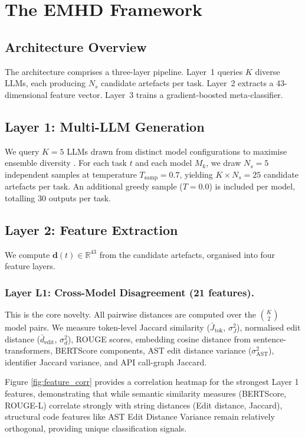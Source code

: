 \documentclass{svproc}
\begin{document}
\section{The EMHD Framework}\label{sec:method}

\subsection{Architecture Overview}

The architecture comprises a three-layer pipeline. Layer~1 queries $K$ diverse LLMs, each producing $N_s$ candidate artefacts per task. Layer~2 extracts a 43-dimensional feature vector. Layer~3 trains a gradient-boosted meta-classifier.

\subsection{Layer 1: Multi-LLM Generation}
We query $K=5$ LLMs drawn from distinct model configurations to maximise ensemble diversity \cite{brown2005diversity}. For each task $t$ and each model $M_k$, we draw $N_s = 5$ independent samples at temperature $T_{\mathrm{samp}} = 0.7$, yielding $K \times N_s = 25$ candidate artefacts per task. An additional greedy sample ($T=0.0$) is included per model, totalling 30 outputs per task.

\subsection{Layer 2: Feature Extraction}\label{sec:features}
We compute $\mathbf{d}(t) \in \mathbb{R}^{43}$ from the candidate artefacts, organised into four feature layers.

\subsubsection{Layer L1: Cross-Model Disagreement (21 features).}
This is the core novelty. All pairwise distances are computed over the $\binom{K}{2}$ model pairs. We measure token-level Jaccard similarity ($\bar{J}_\mathrm{tok}$, $\sigma^2_J$), normalised edit distance ($\bar{d}_\mathrm{edit}$, $\sigma^2_d$), ROUGE scores, embedding cosine distance from sentence-transformers, BERTScore components, AST edit distance variance ($\sigma^2_\mathrm{AST}$), identifier Jaccard variance, and API call-graph Jaccard. 

Figure \ref{fig:feature_corr} provides a correlation heatmap for the strongest Layer 1 features, demonstrating that while semantic similarity measures (BERTScore, ROUGE-L) correlate strongly with string distances (Edit distance, Jaccard), structural code features like AST Edit Distance Variance remain relatively orthogonal, providing unique classification signals.
\end{document}
